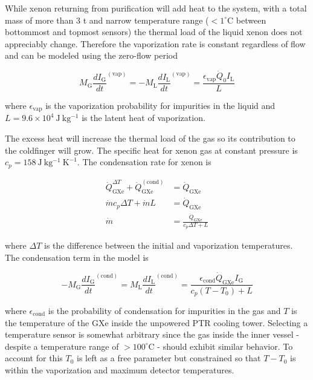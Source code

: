 While xenon returning from purification will add heat to the system, with a total mass of more than 3 t and
narrow temperature range ($< 1^{\circ}\mathrm{C}$ between bottommost and topmost sensors) the thermal load of the liquid xenon does not
appreciably change.  Therefore the vaporization rate is constant regardless of flow and can be modeled using the zero-flow period

\begin{equation}
M_{\mathrm{G}} \frac{dI_{\mathrm{G}}}{dt}^{(\mathrm{vap})} = -M_{\mathrm{L}} \frac{dI_{\mathrm{L}}}{dt}^{(\mathrm{vap})} =
\frac{\epsilon_{\mathrm{vap}} \dot{Q}_0 I_{\mathrm{L}}}{L}
\end{equation}

\noindent where $\epsilon_{\mathrm{vap}}$ is the vaporization probability for impurities in the liquid and
$L = 9.6 \times 10^4\ \mathrm{J\ kg^{-1}}$ is the latent heat of vaporization.

The excess heat will increase the thermal load of the gas so its contribution to the coldfinger will grow.  The specific heat for
xenon gas at constant pressure is $c_p = 158\ \mathrm{J\ kg^{-1}\ K^{-1}}$.  The condensation rate for xenon is

\begin{equation}
\begin{aligned}
\dot{Q}_{\mathrm{GXe}}^{\Delta T} + \dot{Q}_{\mathrm{GXe}}^{(\mathrm{cond})} &= \dot{Q}_{\mathrm{GXe}} \\
\dot{m} c_p \Delta T + \dot{m} L &= \dot{Q}_{\mathrm{GXe}} \\
\dot{m} &= \frac{\dot{Q}_{\mathrm{GXe}}}{c_p \Delta T + L}
\end{aligned}
\end{equation}

\noindent where $\Delta T$ is the difference between the initial and vaporization temperatures.  The condensation term in the model is

\begin{equation}
-M_{\mathrm{G}} \frac{dI_{\mathrm{G}}}{dt}^{(\mathrm{cond})} = M_{\mathrm{L}} \frac{dI_{\mathrm{L}}}{dt}^{(\mathrm{cond})} =
\frac{\epsilon_{\mathrm{cond}} \dot{Q}_{\mathrm{GXe}} I_{\mathrm{G}}}{c_p (T - T_0) + L}
\end{equation}

\noindent where $\epsilon_{\mathrm{cond}}$ is the probability of condensation for impurities in the gas and $T$ is the temperature of
the GXe inside the unpowered PTR cooling tower.  Selecting a temperature sensor is somewhat arbitrary since the gas inside the inner
vessel - despite a temperature range of $> 100^{\circ}\mathrm{C}$ - should exhibit similar behavior.  To account for this $T_0$ is left as
a free parameter but constrained so that $T - T_0$ is within the vaporization and maximum detector temperatures.

